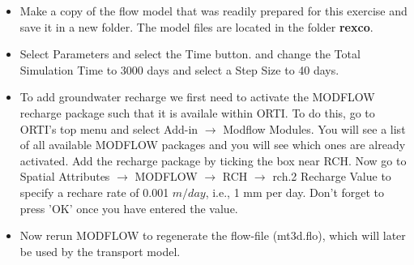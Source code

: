 \begin{itemize}

\item Make a copy of the flow model that was readily prepared for this exercise
and save it in a new folder.
The model files are located in the 
folder {\color{red} \textbf{rexco}}.

\item Select {\color{blue}Parameters} and select the {\color{blue}Time} button.
and change the {\color{blue}Total Simulation Time} to 3000 days and select 
a {\color{blue}Step Size} to 40 days. 

\item To add groundwater recharge we first need to activate the 
MODFLOW recharge package such that it is availale within ORTI.
To do this, go to ORTI's top menu and select {\color{blue}Add-in} 
$\rightarrow$ {\color{blue}Modflow Modules}. You will see a list of 
all available MODFLOW packages and you will see which ones are already activated.
Add the recharge package by ticking the box near {\color{blue}RCH}.
Now go to {\color{blue}Spatial Attributes} $\rightarrow$ {\color{blue}MODFLOW} $\rightarrow$ {\color{blue}RCH} $\rightarrow$ {\color{blue}rch.2 Recharge Value} to specify a rechare rate 
of 0.001 $m/day$, i.e., 1 mm per day. Don't forget to press {\color{blue}'OK'} 
once you have entered the value.   

\item Now rerun MODFLOW to regenerate the flow-file (mt3d.flo), which will later be used 
by the transport model.

\end{itemize}

